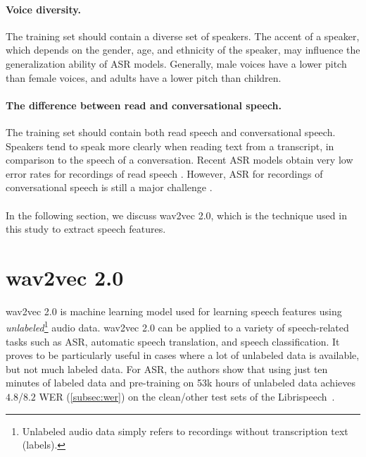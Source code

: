 \paragraph*{Voice diversity.}
The training set should contain a diverse set of speakers.
The accent of a speaker, which depends on the gender, age, and ethnicity of the speaker, 
may influence the generalization ability of ASR models. 
Generally, male voices have a lower pitch than female voices, and adults have a lower pitch than children.

\paragraph*{The difference between read and conversational speech.}
The training set should contain both read speech and conversational speech.
Speakers tend to speak more clearly when reading text from a transcript, in comparison to the speech of a conversation.
Recent ASR models obtain very low error rates for recordings of read speech \cite{jurafskyspeech}.
However, ASR for recordings of conversational speech is still a major challenge \cite{jurafskyspeech}.
\\
\\
In the following section, we discuss wav2vec 2.0, which is the technique used in this study to extract speech features.

\section{wav2vec 2.0}
wav2vec 2.0 \cite{baevski2020wav2vec} is machine learning model used for learning speech features using \emph{unlabeled}\footnote{Unlabeled audio data simply refers to recordings without transcription text (labels).} audio data.
wav2vec 2.0 can be applied to a variety of speech-related tasks such as ASR, automatic speech translation,
and speech classification.
It proves to be particularly useful in cases where a lot of unlabeled data is available, but not much labeled data.
For ASR, the authors show that using just ten minutes of labeled data and pre-training
on 53k hours of unlabeled data achieves $4.8$/$8.2$ WER (\ref{subsec:wer}) on the clean/other test sets of the Librispeech~\cite{panayotov2015librispeech}.

